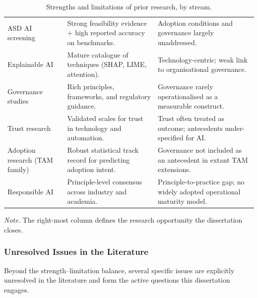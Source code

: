 {\tablestripes\tablefontsize
{}
\begin{xltabular}{\textwidth}{@{} >{\raggedright\arraybackslash}p{3.0cm} >{\raggedright\arraybackslash}p{5.5cm} L @{}}
\caption[Strengths and limitations of prior research, by stream]{Strengths and limitations of prior research, by stream.}\label{tab:ch2_strengths_limitations} \\
\toprule
{} &  &  \\
\midrule
\endfirsthead
\endhead
\bottomrule
\endlastfoot
ASD AI screening & Strong feasibility evidence + high reported accuracy on benchmarks. & Adoption conditions and governance largely unaddressed. \\
\addlinespace
Explainable AI & Mature catalogue of techniques (SHAP, LIME, attention). & Technology-centric; weak link to organisational governance. \\
\addlinespace
Governance studies & Rich principles, frameworks, and regulatory guidance. & Governance rarely operationalised as a measurable construct. \\
\addlinespace
Trust research & Validated scales for trust in technology and automation. & Trust often treated as outcome; antecedents under-specified for AI. \\
\addlinespace
Adoption research (TAM family) & Robust statistical track record for predicting adoption intent. & Governance not included as an antecedent in extant TAM extensions. \\
\addlinespace
Responsible AI & Principle-level consensus across industry and academia. & Principle-to-practice gap; no widely adopted operational maturity model. \\
\end{xltabular}}

\vspace{0.3em}\noindent\textit{Note.} The right-most column defines the research opportunity the dissertation closes.


\subsubsection{Unresolved Issues in the Literature}
\label{sec:ch2_unresolved_issues}

\noindent Beyond the strength--limitation balance, several specific issues are explicitly unresolved in the literature and form the active questions this dissertation engages.

